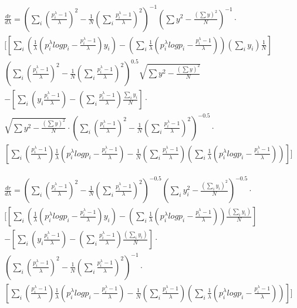 \begin{multline}
\frac{dr}{d\lambda}=
\left(\sum_i\left(\frac{p_i^{\lambda}-1}{\lambda}\right)^2-\frac{1}{N}\left(\sum_i \frac{p_i^{\lambda}-1}{\lambda}\right)^2  \right)^{-1} 
\left(\sum{y^2}-\frac{\left(\sum{y}\right)^2}{N}\right)^{-1}\cdot  \\
[
\left[
\sum_i\left(\frac{1}{\lambda}\left(p_i^{\lambda}log{p_i}-\frac{p_i^{\lambda}-1}{\lambda}\right)y_i\right) -  
\left(\sum_i\frac{1}{\lambda}\left(p_i^{\lambda}log{p_i}-\frac{p_i^{\lambda}-1}{\lambda}\right)\right)\left(\sum_iy_i\right)\frac{1}{N}
\right]  \\
\left(\sum_i\left(\frac{p_i^{\lambda}-1}{\lambda}\right)^2-\frac{1}{N}\left(\sum_i \frac{p_i^{\lambda}-1}{\lambda}\right)^2  \right)^{0.5} 
\sqrt{\sum{y^2}-\frac{\left(\sum{y}\right)^2}{N}}  \\
-
\left[\sum_i \left(y_i\frac{p_i^{\lambda}-1}{\lambda}\right) - \left(\sum_i\frac{p_i^{\lambda}-1}{\lambda}\right)\frac{\sum_iy_i}{N}\right]\cdot\\
\sqrt{\sum{y^2}-\frac{\left(\sum{y}\right)^2}{N}}\cdot
\left(\sum_i\left(\frac{p_i^{\lambda}-1}{\lambda}\right)^2-\frac{1}{N}\left(\sum_i \frac{p_i^{\lambda}-1}{\lambda}\right)^2  \right)^{-0.5} 
\cdot\\
\left[
\sum_i\left(\frac{p_i^{\lambda}-1}{\lambda} \right)\frac{1}{\lambda}\left(p_i^{\lambda}log{p_i}-\frac{p_i^{\lambda}-1}{\lambda}\right)
-\frac{1}{N}\left(\sum_i \frac{p_i^{\lambda}-1}{\lambda}\right) \left(\sum_i \frac{1}{\lambda}\left(p_i^{\lambda}log{p_i}-\frac{p_i^{\lambda}-1}{\lambda}\right) \right)
\right]
]
\end{multline}

\begin{multline}
\frac{dr}{d\lambda}=
\left(\sum_i\left(\frac{p_i^{\lambda}-1}{\lambda}\right)^2-\frac{1}{N}\left(\sum_i \frac{p_i^{\lambda}-1}{\lambda}\right)^2  \right)^{-0.5} 
\left(\sum_i{y_i^2}-\frac{\left(\sum_i{y_i}\right)^2}{N}\right)^{-0.5}\cdot  \\
[
\left[
\sum_i\left(\frac{1}{\lambda}\left(p_i^{\lambda}log{p_i}-\frac{p_i^{\lambda}-1}{\lambda}\right)y_i\right) -  
\left(\sum_i\frac{1}{\lambda}\left(p_i^{\lambda}log{p_i}-\frac{p_i^{\lambda}-1}{\lambda}\right)\right)\frac{\left(\sum_iy_i\right)}{N}
\right]  \\
-
\left[\sum_i \left(y_i\frac{p_i^{\lambda}-1}{\lambda}\right) - \left(\sum_i\frac{p_i^{\lambda}-1}{\lambda}\right)\frac{\left(\sum_iy_i\right)}{N}\right]\cdot\\
\left(\sum_i\left(\frac{p_i^{\lambda}-1}{\lambda}\right)^2-\frac{1}{N}\left(\sum_i \frac{p_i^{\lambda}-1}{\lambda}\right)^2  \right)^{-1} 
\cdot\\
\left[
\sum_i\left(\frac{p_i^{\lambda}-1}{\lambda} \right)\frac{1}{\lambda}\left(p_i^{\lambda}log{p_i}-\frac{p_i^{\lambda}-1}{\lambda}\right)
-\frac{1}{N}\left(\sum_i \frac{p_i^{\lambda}-1}{\lambda}\right) \left(\sum_i \frac{1}{\lambda}\left(p_i^{\lambda}log{p_i}-\frac{p_i^{\lambda}-1}{\lambda}\right) \right)
\right]
]
\end{multline}

